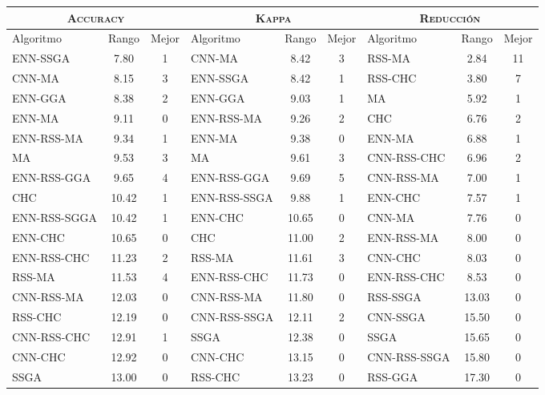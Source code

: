 \begin{table}[]
\centering
\begin{adjustbox}{max width =\textwidth}
\begin{tabular}{l c c|l c c|l c c}
\hline
\multicolumn{3}{c|}{\textsc{Accuracy}}
	& \multicolumn{3}{c|}{\textsc{Kappa}}
	& \multicolumn{3}{c}{\textsc{Reducción}} \\
\hline
Algoritmo & Rango & Mejor & Algoritmo & Rango & Mejor & Algoritmo & Rango & Mejor \\
\hline
\hline

ENN-SSGA     & 7.80  & 1 & CNN-MA       & 8.42  & 3 & RSS-MA       & 2.84  & 11 \\
CNN-MA       & 8.15  & 3 & ENN-SSGA     & 8.42  & 1 & RSS-CHC      & 3.80  & 7  \\
ENN-GGA      & 8.38  & 2 & ENN-GGA      & 9.03  & 1 & MA           & 5.92  & 1  \\
ENN-MA       & 9.11  & 0 & ENN-RSS-MA   & 9.26  & 2 & CHC          & 6.76  & 2  \\
ENN-RSS-MA   & 9.34  & 1 & ENN-MA       & 9.38  & 0 & ENN-MA       & 6.88  & 1  \\
MA           & 9.53  & 3 & MA           & 9.61  & 3 & CNN-RSS-CHC  & 6.96  & 2  \\
ENN-RSS-GGA  & 9.65  & 4 & ENN-RSS-GGA  & 9.69  & 5 & CNN-RSS-MA   & 7.00  & 1  \\
CHC          & 10.42 & 1 & ENN-RSS-SSGA & 9.88  & 1 & ENN-CHC      & 7.57  & 1  \\
ENN-RSS-SGGA & 10.42 & 1 & ENN-CHC      & 10.65 & 0 & CNN-MA       & 7.76  & 0  \\
ENN-CHC      & 10.65 & 0 & CHC          & 11.00 & 2 & ENN-RSS-MA   & 8.00  & 0  \\
ENN-RSS-CHC  & 11.23 & 2 & RSS-MA       & 11.61 & 3 & CNN-CHC      & 8.03  & 0  \\
RSS-MA       & 11.53 & 4 & ENN-RSS-CHC  & 11.73 & 0 & ENN-RSS-CHC  & 8.53  & 0  \\
CNN-RSS-MA   & 12.03 & 0 & CNN-RSS-MA   & 11.80 & 0 & RSS-SSGA     & 13.03 & 0  \\
RSS-CHC      & 12.19 & 0 & CNN-RSS-SSGA & 12.11 & 2 & CNN-SSGA     & 15.50 & 0  \\
CNN-RSS-CHC  & 12.91 & 1 & SSGA         & 12.38 & 0 & SSGA         & 15.65 & 0  \\
CNN-CHC      & 12.92 & 0 & CNN-CHC      & 13.15 & 0 & CNN-RSS-SSGA & 15.80 & 0  \\
SSGA         & 13.00 & 0 & RSS-CHC      & 13.23 & 0 & RSS-GGA      & 17.30 & 0  \\

\end{tabular}
\end{adjustbox}
\end{table}
